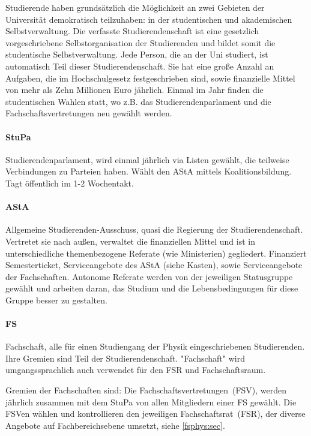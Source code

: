 \begin{multicols*}{2}
Studierende haben grundsätzlich die Möglichkeit an zwei Gebieten der Universität demokratisch teilzuhaben: in der studentischen und akademischen Selbstverwaltung.
Die verfasste Studierendenschaft ist eine gesetzlich vorgeschriebene Selbstorganisation der Studierenden und bildet somit die studentische Selbstverwaltung. Jede Person, die an der Uni studiert, ist automatisch Teil dieser Studierendenschaft. Sie hat eine große Anzahl an Aufgaben, die im Hochschulgesetz festgeschrieben sind, sowie finanzielle Mittel von mehr als Zehn Millionen Euro jährlich. 
Einmal im Jahr finden die studentischen Wahlen statt, wo z.B. das Studierendenparlament und die Fachschaftsvertretungen neu gewählt werden. 

\paragraph{StuPa}
Studierendenparlament, wird einmal jährlich via Listen gewählt, die teilweise Verbindungen zu Parteien haben. Wählt den AStA mittels Koalitionsbildung. Tagt öffentlich im 1-2 Wochentakt. 


\paragraph{AStA}
Allgemeine Studierenden-Ausschuss, quasi die Regierung der Studierendenschaft. Vertretet sie nach außen, verwaltet die finanziellen Mittel und ist in unterschiedliche themenbezogene Referate (wie Ministerien) gegliedert. Finanziert Semesterticket, Serviceangebote des AStA (siehe Kasten), sowie Serviceangebote der Fachschaften. Autonome Referate werden von der jeweiligen Statusgruppe gewählt und arbeiten daran, das Studium und die Lebensbedingungen für diese Gruppe besser zu gestalten.


\paragraph{FS}
Fachschaft, alle für einen Studiengang der Physik eingeschriebenen Studierenden. Ihre Gremien sind Teil der Studierendenschaft. "Fachschaft" wird umgangssprachlich auch verwendet für den FSR und Fachschaftsraum.

Gremien der Fachschaften sind: Die Fachschaftsvertretungen~(FSV), werden jährlich zusammen mit dem StuPa von allen Mitgliedern einer FS gewählt. Die FSVen wählen und kontrollieren den jeweiligen Fachschaftsrat~(FSR), der diverse Angebote auf Fachbereichsebene umsetzt, siehe \cref{fsphys:sec}.


\end{multicols*}
